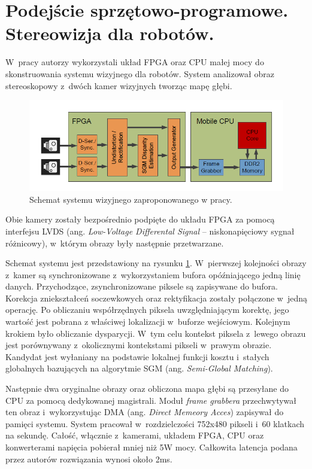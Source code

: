 \section{Podejście sprzętowo-programowe. Stereowizja dla robotów.}

W~pracy \cite{honegger2014real} autorzy wykorzystali układ FPGA oraz CPU małej mocy do skonstruowania systemu wizyjnego dla robotów.
System analizował obraz stereoskopowy z~dwóch kamer wizyjnych tworząc mapę głębi.
\begin{figure}[h]
\centering
\includegraphics[width=1\textwidth]{images/honegger2014real_Fig1}
\caption{Schemat systemu wizyjnego zaproponowanego w pracy\cite{honegger2014real}.}
\label{fig:honegger2014real_Fig1}
\end{figure}
Obie kamery zostały bezpośrednio podpięte do układu FPGA za pomocą interfejsu LVDS (ang. \textit{Low-Voltage Differental Signal} -- niskonapięciowy sygnał różnicowy), w~którym obrazy były następnie przetwarzane.

Schemat systemu jest przedstawiony na rysunku \ref{fig:honegger2014real_Fig1}. 
W~pierwszej kolejności obrazy z~kamer są synchronizowane z~wykorzystaniem bufora opóźniającego jedną linię danych.
Przychodzące, zsynchronizowane piksele są zapisywane do bufora. 
Korekcja zniekształceń soczewkowych oraz rektyfikacja zostały połączone w~jedną operację. 
Po obliczaniu współrzędnych piksela uwzględniającym korektę, jego wartość jest pobrana z właściwej lokalizacji w~buforze wejściowym. 
Kolejnym krokiem było obliczanie dysparycji. 
W~tym celu kontekst piksela z~lewego obrazu jest porównywany z~okolicznymi kontekstami pikseli w~prawym obrazie. 
Kandydat jest wyłaniany na podstawie lokalnej funkcji kosztu i~stałych globalnych bazujących na algorytmie SGM (ang. \textit{Semi-Global Matching}).

Następnie dwa oryginalne obrazy oraz obliczona mapa głębi są przesyłane do CPU za pomocą dedykowanej magistrali.
Moduł \textit{frame grabbera} przechwytywał ten obraz i~wykorzystując DMA (ang. \textit{Direct Memeory Acces}) zapisywał do pamięci systemu.
System pracował w~rozdzielczości 752x480 pikseli i~60 klatkach na sekundę.
Całość, włącznie z~kamerami, układem FPGA, CPU oraz konwerterami napięcia pobierał mniej niż 5W mocy.
Całkowita latencja podana przez autorów rozwiązania wynosi około 2ms.

